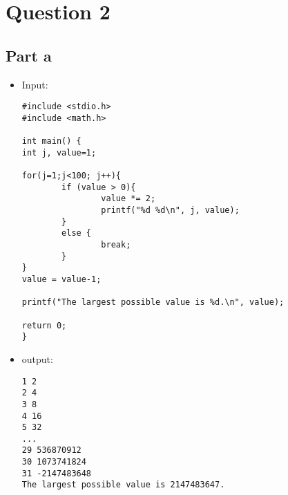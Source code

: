 \documentclass[10pt]{article}
\begin{document}
\section{Question 2}
\subsection{Part a}
\begin{itemize}
\item Input:
\begin{verbatim}
#include <stdio.h>
#include <math.h>

int main() {
int j, value=1;

for(j=1;j<100; j++){
        if (value > 0){
                value *= 2;
                printf("%d %d\n", j, value);
        }
        else {
                break;
        }
}
value = value-1;

printf("The largest possible value is %d.\n", value);

return 0;
}
\end{verbatim}

\item output:
\begin{verbatim}
1 2
2 4
3 8
4 16
5 32
...
29 536870912
30 1073741824
31 -2147483648
The largest possible value is 2147483647.
\end{verbatim}
\end{itemize}
\end{document}
